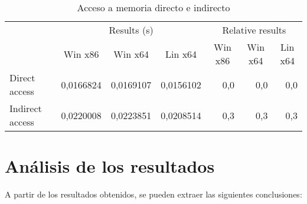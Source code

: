 \begin{table}[h]
\centering
\begin{tabular}{@{}l|crr|crr|@{}}
\cmidrule(l){2-7}
                                      & \multicolumn{3}{c|}{Results (s)}                                                                & \multicolumn{3}{c|}{Relative results}                                                      \\ \cmidrule(l){2-7} 
                                      & \multicolumn{1}{c|}{Win x86}  & \multicolumn{1}{c|}{Win x64} & \multicolumn{1}{c|}{Lin x64} & \multicolumn{1}{c|}{Win x86} & \multicolumn{1}{c|}{Win x64} & \multicolumn{1}{c|}{Lin x64} \\ \midrule
\multicolumn{1}{|l|}{Direct access}   & \multicolumn{1}{r}{0,0166824} & 0,0169107                    & 0,0156102                    & \multicolumn{1}{r}{0,0}      & 0,0                          & 0,0                          \\ \cmidrule(r){1-1}
\multicolumn{1}{|l|}{Indirect access} & \multicolumn{1}{r}{0,0220008} & 0,0223851                    & 0,0208514                    & \multicolumn{1}{r}{0,3}      & 0,3                          & 0,3                          \\ \bottomrule
\end{tabular}
\caption{Acceso a memoria directo e indirecto}
\label{tab:alignment}
\end{table}

\section{Análisis de los resultados}

A partir de los resultados obtenidos, se pueden extraer las siguientes conclusiones:


